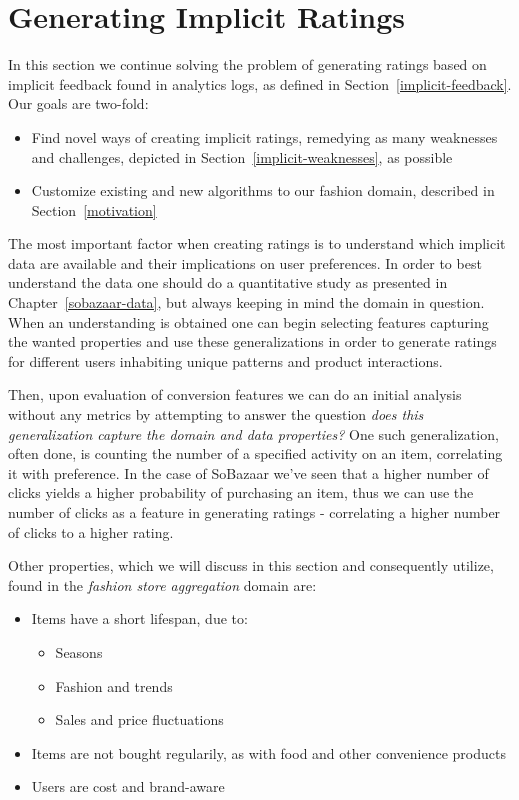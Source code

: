 \section{Generating Implicit Ratings}
\label{sec:implementation-implicit}

In this section we continue solving the problem of generating ratings based on
implicit feedback found in analytics logs, as defined in
Section~\ref{implicit-feedback}. Our goals are two-fold:

\begin{itemize}
  \item Find novel ways of creating implicit ratings, remedying as many
  weaknesses and challenges, depicted in Section~\ref{implicit-weaknesses}, as
  possible
  \item Customize existing and new algorithms to our fashion domain, described
  in Section~\ref{motivation}
\end{itemize}

The most important factor when creating ratings is to understand which implicit
data are available and their implications on user preferences. In order to best
understand the data one should do a quantitative study as presented in
Chapter~\ref{sobazaar-data}, but always keeping in mind the domain in question.
When an understanding is obtained one can begin selecting features capturing
the wanted properties and use these generalizations in order to generate
ratings for different users inhabiting unique patterns and product
interactions.

Then, upon evaluation of conversion features we can do an initial analysis
without any metrics by attempting to answer the question \textit{does this
generalization capture the domain and data properties?}
One such generalization, often done, is counting the number of a specified
activity on an item, correlating it with preference. In the case of SoBazaar
we've seen that a higher number of clicks yields a higher probability of
purchasing an item, thus we can use the number of clicks as a feature in
generating ratings - correlating a higher number of clicks to a higher rating.

Other properties, which we will discuss in this section and consequently
utilize, found in the \textit{fashion store aggregation} domain are:

\begin{itemize}
  \item Items have a short lifespan, due to:
  \begin{itemize}
    \item Seasons
    \item Fashion and trends
    \item Sales and price fluctuations
  \end{itemize}
  \item Items are not bought regularily, as with food and other convenience
  products
  \item Users are cost and brand-aware
\end{itemize}

